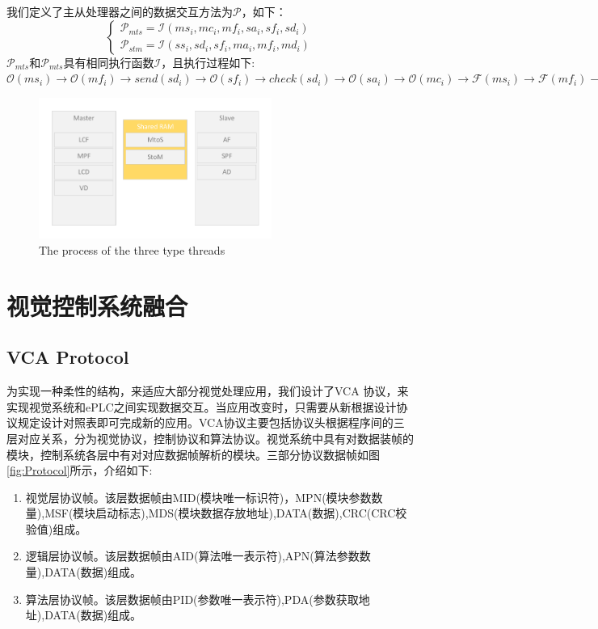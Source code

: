 \documentclass[journal,UTF8]{IEEEtran}
\begin{document}
 我们定义了主从处理器之间的数据交互方法为$\mathcal{P}$，如下：
\begin{equation}
\left\{
\begin{array}{l}
\mathcal{P}_{mts} =\mathcal{I} (ms_i,mc_i,mf_i,sa_i,sf_i,sd_i)\\
\mathcal{P}_{stm} =\mathcal{I} (ss_i,sd_i,sf_i,ma_i,mf_i,md_i)
\end{array}
\right.
\end{equation}
$\mathcal{P}_{mts}$和$\mathcal{P}_{mts}$具有相同执行函数$\mathcal{I}$，且执行过程如下:
$\mathcal{O}(ms_i)\to\mathcal{O}(mf_i)\to send(sd_i)\to\mathcal{O}(sf_i)\to check(sd_i)\to\mathcal{O}(sa_i)\to\mathcal{O}(mc_i)\to\mathcal{F}(ms_i)\to\mathcal{F}(mf_i)\to\mathcal{F}(mc_i)\to\mathcal{F}(sf_i)\to\mathcal{F}(sa_i)$
\begin{figure}
	\centering
	\includegraphics[width=3in]{fig/RAM.pdf}
	\caption{ The process of the three type threads}
	\label{fig:RAM}
\end{figure}

\section{视觉控制系统融合}
\label{Integration}

\subsection{VCA Protocol}
为实现一种柔性的结构，来适应大部分视觉处理应用，我们设计了VCA 协议，来实现视觉系统和ePLC之间实现数据交互。当应用改变时，只需要从新根据设计协议规定设计对照表即可完成新的应用。VCA协议主要包括协议头根据程序间的三层对应关系，分为视觉协议，控制协议和算法协议。视觉系统中具有对数据装帧的模块，控制系统各层中有对对应数据帧解析的模块。三部分协议数据帧如图\ref{fig:Protocol}所示，介绍如下:
\begin{enumerate}
	\item 视觉层协议帧。该层数据帧由MID(模块唯一标识符)，MPN(模块参数数量),MSF(模块启动标志),MDS(模块数据存放地址),DATA(数据),CRC(CRC校验值)组成。
	\item 逻辑层协议帧。该层数据帧由AID(算法唯一表示符),APN(算法参数数量),DATA(数据)组成。
	\item 算法层协议帧。该层数据帧由PID(参数唯一表示符),PDA(参数获取地址),DATA(数据)组成。
\end{enumerate}
\end{document}
